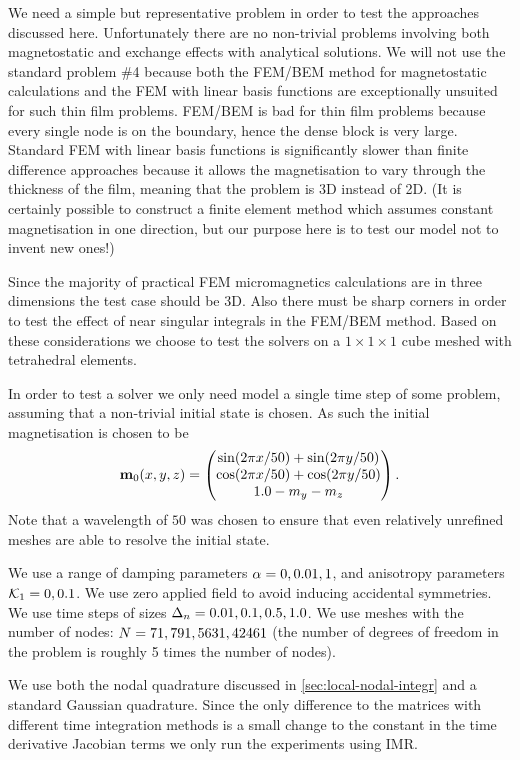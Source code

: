 We need a simple but representative problem in order to test the approaches discussed here.
Unfortunately there are no non-trivial problems involving both magnetostatic and exchange effects with analytical solutions.
We will not use the \mumag standard problem \#4 because both the FEM/BEM method for magnetostatic calculations and the FEM with linear basis functions are exceptionally unsuited for such thin film problems.
FEM/BEM is bad for thin film problems because every single node is on the boundary, hence the dense block is very large.
Standard FEM with linear basis functions is significantly slower than finite difference approaches because it allows the magnetisation to vary through the thickness of the film, meaning that the problem is 3D instead of 2D.
(It is certainly possible to construct a finite element method which assumes constant magnetisation in one direction, but our purpose here is to test our model not to invent new ones!)

Since the majority of practical FEM micromagnetics calculations are in three dimensions the test case should be 3D.
Also there must be sharp corners in order to test the effect of near singular integrals in the FEM/BEM method.
Based on these considerations we choose to test the solvers on a $1\times 1 \times 1$ cube meshed with tetrahedral elements.

In order to test a solver we only need model a single time step of some problem, assuming that a non-trivial initial state is chosen.
As such the initial magnetisation is chosen to be
\begin{equation}
  \boldsymbol{\mathrm{m}}_0(x, y, z) = \begin{pmatrix} \sin(2\pi x/50) + \sin(2\pi y/50) \\ \cos(2\pi x/50) + \cos(2 \pi y/50) \\ 1.0 - m_y - m_z \end{pmatrix}.
\end{equation}
Note that a wavelength of $50$ was chosen to ensure that even relatively unrefined meshes are able to resolve the initial state.

We use a range of damping parameters $\alpha = 0, 0.01, 1$, and anisotropy parameters $\mathcal{K}_1 = 0, 0.1$.
We use zero applied field to avoid inducing accidental symmetries.
We use time steps of sizes $\Delta_{n} = 0.01, 0.1, 0.5, 1.0$.
We use meshes with the number of nodes: $N= 71, 791, 5631, 42461$ (the number of degrees of freedom in the problem is roughly 5 times the number of nodes).

We use both the nodal quadrature discussed in \cref{sec:local-nodal-integr} and a standard Gaussian quadrature.
Since the only difference to the matrices with different time integration methods is a small change to the constant in the time derivative Jacobian terms we only run the experiments using IMR.


